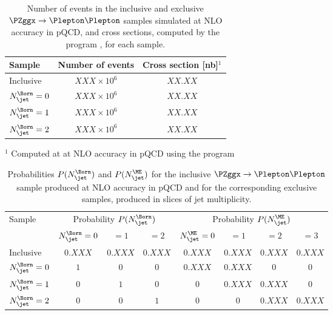 \begin{table}[h!]
\begin{center}
\begin{tabular}{l|c|c}
\hline
Sample                 & Number of events    & Cross section [nb]$^{1}$ \\
\hline
\hline
Inclusive              & $XXX \times 10^{6}$ & $XX.XX$ \\
\hline
$N_{\jet}^{\Born} = 0$ & $XXX \times 10^{6}$ & $XX.XX$ \\
$N_{\jet}^{\Born} = 1$ & $XXX \times 10^{6}$ & $XX.XX$ \\
$N_{\jet}^{\Born} = 2$ & $XXX \times 10^{6}$ & $XX.XX$ \\
\hline
\end{tabular}
\end{center}
$^{1}$ Computed at at NLO accuracy in pQCD using the program \MGvATNLO
\caption{
  Number of events in the inclusive and exclusive $\PZggx \to \Plepton\Plepton$ samples simulated at NLO accuracy in pQCD,
  and cross sections, computed by the program \MGvATNLO, for each sample.
}
\label{tab:samples_DYJets_vs_Njet}
\end{table}

\begin{table}[h!]
\begin{center}
\begin{tabular}{l|ccc|cccc}
\hline
\multirow{2}{20mm}{Sample} & \multicolumn{3}{c}{Probability $P(N_{\jet}^{\Born})$} & \multicolumn{4}{c}{Probability $P(N_{\jet}^{\ME})$} \\
                           & $N_{\jet}^{\Born} = 0$ & $= 1$   & $= 2$              & $N_{\jet}^{\ME} = 0$ & $= 1$   & $= 2$   & $= 3$ \\
\hline
\hline
Inclusive                  & $0.XXX$                & $0.XXX$ & $0.XXX$            & $0.XXX$              & $0.XXX$ & $0.XXX$ & $0.XXX$ \\
\hline
$N_{\jet}^{\Born} = 0$     & $1$                    & $0$     & $0$                & $0.XXX$              & $0.XXX$ & $0$     & $0$     \\
$N_{\jet}^{\Born} = 1$     & $0$                    & $1$     & $0$                & $0$                  & $0.XXX$ & $0.XXX$ & $0$     \\
$N_{\jet}^{\Born} = 2$     & $0$                    & $0$     & $1$                & $0$                  & $0$     & $0.XXX$ & $0.XXX$ \\
\hline
\end{tabular}
\end{center}
\caption{
  Probabilities $P(N_{\jet}^{\Born})$ and $P(N_{\jet}^{\ME})$ for the inclusive $\PZggx \to \Plepton\Plepton$ sample produced at NLO accuracy in pQCD 
  and for the corresponding exclusive samples, produced in slices of jet multiplicity.
}
\label{tab:probabilities_exclusive_DYJets_vs_Njet}
\end{table}

